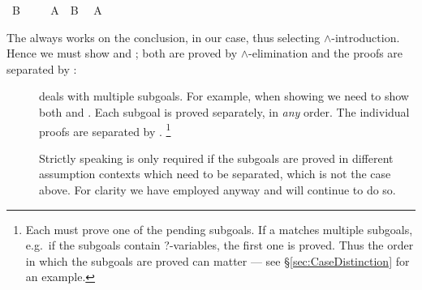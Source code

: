 \begin{isabellebody}
\ {\isachardoublequoteopen}B{\isachardoublequoteclose}\ \isacommand{{\isachardot}{\isachardot}}\isamarkupfalse%
\isanewline
{}\isamarkupfalse%
\isanewline
\ \ \isamarkupfalse%
\ {\isachardoublequoteopen}A\ {\isasymand}\ B{\isachardoublequoteclose}\ \isamarkupfalse%
\ {\isachardoublequoteopen}A{\isachardoublequoteclose}\ \isacommand{{\isachardot}{\isachardot}}\isamarkupfalse%
\isanewline
{}\isamarkupfalse%
%
\endisatagproof
{\isafoldproof}%
%
\isadelimproof
%
\endisadelimproof
%
\begin{isamarkuptext}%
\noindent The  always works on the conclusion,
 in our case, thus selecting $\land$-introduction. Hence
we must show  and ; both are proved by
$\land$-elimination and the proofs are separated by :
\begin{description}
\item[] deals with multiple subgoals. For example,
when showing  we need to show both  and .  Each subgoal is proved separately, in \emph{any} order. The
individual proofs are separated by .  \footnote{Each
 must prove one of the pending subgoals.  If a
 matches multiple subgoals, e.g.\ if the subgoals
contain ?-variables, the first one is proved. Thus the order in which
the subgoals are proved can matter --- see
\S\ref{sec:CaseDistinction} for an example.}

Strictly speaking  is only required if the subgoals
are proved in different assumption contexts which need to be
separated, which is not the case above. For clarity we
have employed  anyway and will continue to do so.
\end{description}


\end{isamarkuptext}
\end{isabellebody}
